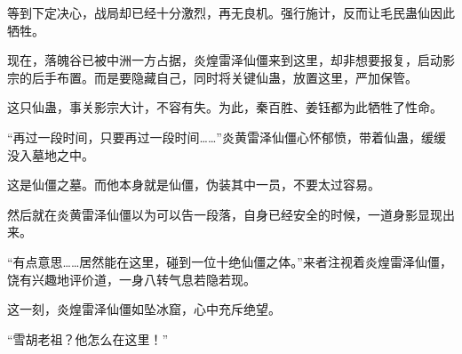 \begin{this_body}
等到下定决心，战局却已经十分激烈，再无良机。强行施计，反而让毛民蛊仙因此牺牲。

现在，落魄谷已被中洲一方占据，炎煌雷泽仙僵来到这里，却非想要报复，启动影宗的后手布置。而是要隐藏自己，同时将关键仙蛊，放置这里，严加保管。

这只仙蛊，事关影宗大计，不容有失。为此，秦百胜、姜钰都为此牺牲了性命。

“再过一段时间，只要再过一段时间……”炎黄雷泽仙僵心怀郁愤，带着仙蛊，缓缓没入墓地之中。

这是仙僵之墓。而他本身就是仙僵，伪装其中一员，不要太过容易。

然后就在炎黄雷泽仙僵以为可以告一段落，自身已经安全的时候，一道身影显现出来。

“有点意思……居然能在这里，碰到一位十绝仙僵之体。”来者注视着炎煌雷泽仙僵，饶有兴趣地评价道，一身八转气息若隐若现。

这一刻，炎煌雷泽仙僵如坠冰窟，心中充斥绝望。

“雪胡老祖？他怎么在这里！”

\end{this_body}

